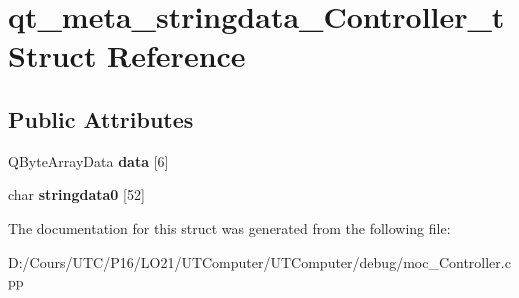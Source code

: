 \hypertarget{structqt__meta__stringdata___controller__t}{}\section{qt\+\_\+meta\+\_\+stringdata\+\_\+\+Controller\+\_\+t Struct Reference}
\label{structqt__meta__stringdata___controller__t}
\subsection*{Public Attributes}
\begin{DoxyCompactItemize}
\item 
Q\+Byte\+Array\+Data {\bfseries data} \mbox{[}6\mbox{]}\hypertarget{structqt__meta__stringdata___controller__t_a50aebfff5b6c8982d9d9614952eddead}{}\label{structqt__meta__stringdata___controller__t_a50aebfff5b6c8982d9d9614952eddead}

\item 
char {\bfseries stringdata0} \mbox{[}52\mbox{]}\hypertarget{structqt__meta__stringdata___controller__t_a3e34b4d94f377102edb0c4ca2b48ffcf}{}\label{structqt__meta__stringdata___controller__t_a3e34b4d94f377102edb0c4ca2b48ffcf}

\end{DoxyCompactItemize}


The documentation for this struct was generated from the following file\+:\begin{DoxyCompactItemize}
\item 
D\+:/\+Cours/\+U\+T\+C/\+P16/\+L\+O21/\+U\+T\+Computer/\+U\+T\+Computer/debug/moc\+\_\+\+Controller.\+cpp\end{DoxyCompactItemize}
